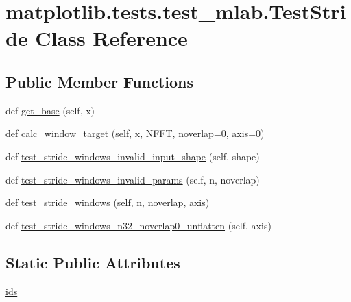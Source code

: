 \hypertarget{classmatplotlib_1_1tests_1_1test__mlab_1_1TestStride}{}\section{matplotlib.\+tests.\+test\+\_\+mlab.\+Test\+Stride Class Reference}
\label{classmatplotlib_1_1tests_1_1test__mlab_1_1TestStride}
\subsection*{Public Member Functions}
\begin{DoxyCompactItemize}
\item 
def \hyperlink{classmatplotlib_1_1tests_1_1test__mlab_1_1TestStride_a9e0f1993d6b543dc8a9748a69a561e21}{get\+\_\+base} (self, x)
\item 
def \hyperlink{classmatplotlib_1_1tests_1_1test__mlab_1_1TestStride_a0da16f20e707f0d87085e46a818e8993}{calc\+\_\+window\+\_\+target} (self, x, N\+F\+FT, noverlap=0, axis=0)
\item 
def \hyperlink{classmatplotlib_1_1tests_1_1test__mlab_1_1TestStride_ad21bc0bbb266b90e7da951934952369a}{test\+\_\+stride\+\_\+windows\+\_\+invalid\+\_\+input\+\_\+shape} (self, shape)
\item 
def \hyperlink{classmatplotlib_1_1tests_1_1test__mlab_1_1TestStride_ad426867ff1edf90ac1a747814d7d3dad}{test\+\_\+stride\+\_\+windows\+\_\+invalid\+\_\+params} (self, n, noverlap)
\item 
def \hyperlink{classmatplotlib_1_1tests_1_1test__mlab_1_1TestStride_a9d539959f974b8ae7ebee194538c48e4}{test\+\_\+stride\+\_\+windows} (self, n, noverlap, axis)
\item 
def \hyperlink{classmatplotlib_1_1tests_1_1test__mlab_1_1TestStride_acf8593097d22825fd3528bca5c754a02}{test\+\_\+stride\+\_\+windows\+\_\+n32\+\_\+noverlap0\+\_\+unflatten} (self, axis)
\end{DoxyCompactItemize}
\subsection*{Static Public Attributes}
\begin{DoxyCompactItemize}
\item 
\hyperlink{classmatplotlib_1_1tests_1_1test__mlab_1_1TestStride_a7d1d0e534aa485593a66b09b238d0e37}{ids}
\end{DoxyCompactItemize}


